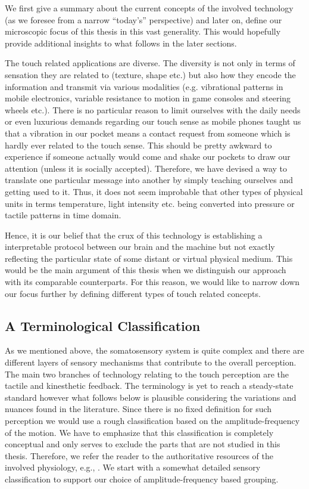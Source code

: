 We first give a summary about the current concepts of the involved technology (as we foresee from a narrow \enquote{today's} perspective) and later on, define our microscopic focus of this thesis in this vast generality. This would hopefully provide additional insights to what follows in the later sections.  


The touch related applications are diverse. The diversity is not only in terms of sensation they are related to (texture, shape etc.) but also how they encode the information and transmit via various modalities (e.g. vibrational patterns in mobile electronics, variable resistance to motion in game consoles and steering wheels etc.). There is no particular reason to limit ourselves with the daily needs or even luxurious demands regarding our touch sense as mobile phones taught us that a vibration in our pocket means a contact request from someone which is hardly ever related to the touch sense. This should be pretty awkward to experience if someone actually would come and shake our pockets to draw our attention (unless it is socially accepted). Therefore, we have devised a way to translate one particular message into another by simply teaching ourselves and getting used to it. Thus, it does not seem improbable that other types of physical units in terms temperature, light intensity etc. being converted into pressure or tactile patterns in time domain.

Hence, it is our belief that the crux of this technology is establishing a interpretable protocol between our brain and the machine but not exactly reflecting the particular state of some distant or virtual physical medium. 
This would be the main argument of this thesis when we distinguish our approach with its comparable counterparts. For this reason, we would like to narrow down our focus further by defining different types of touch related concepts.

\subsection{A Terminological Classification}

As we mentioned above, the somatosensory system is quite complex and there are different layers of sensory mechanisms that contribute to the overall perception. The main two branches of technology relating to the touch perception are the tactile and kinesthetic  feedback. The terminology is yet to reach a steady-state standard however what follows below is plausible considering the variations and nuances found in the literature. Since there is no fixed definition for such perception we would use a rough  classification based on the amplitude-frequency of the motion. We have to emphasize that this classification is completely conceptual and only serves to exclude the parts that are not studied in this thesis. Therefore, we refer the reader to the authoritative resources of the involved physiology, e.g., \cite{kandel}. We start with a somewhat detailed sensory classification to support our choice of amplitude-frequency based grouping.

